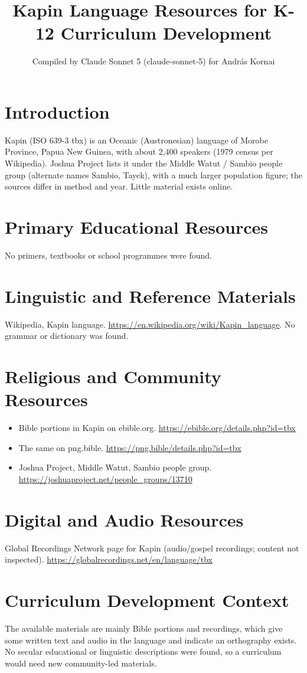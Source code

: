 \documentclass[12pt]{article}
\title{Kapin Language Resources for K-12 Curriculum Development}
\author{Compiled by Claude Sonnet 5 (claude-sonnet-5) for Andr\'as Kornai}
\date{}
\begin{document}
\maketitle
\section{Introduction}
Kapin (ISO 639-3 tbx) is an Oceanic (Austronesian) language of Morobe Province, Papua New Guinea, with about 2,400 speakers (1979 census per Wikipedia). Joshua Project lists it under the Middle Watut / Sambio people group (alternate names Sambio, Tayek), with a much larger population figure; the sources differ in method and year. Little material exists online.
\section{Primary Educational Resources}
No primers, textbooks or school programmes were found.
\section{Linguistic and Reference Materials}
Wikipedia, Kapin language. \url{https://en.wikipedia.org/wiki/Kapin_language}. No grammar or dictionary was found.
\section{Religious and Community Resources}
\begin{itemize}
\item Bible portions in Kapin on ebible.org. \url{https://ebible.org/details.php?id=tbx}
\item The same on png.bible. \url{https://png.bible/details.php?id=tbx}
\item Joshua Project, Middle Watut, Sambio people group. \url{https://joshuaproject.net/people_groups/13710}
\end{itemize}
\section{Digital and Audio Resources}
Global Recordings Network page for Kapin (audio/gospel recordings; content not inspected). \url{https://globalrecordings.net/en/language/tbx}
\section{Curriculum Development Context}
The available materials are mainly Bible portions and recordings, which give some written text and audio in the language and indicate an orthography exists. No secular educational or linguistic descriptions were found, so a curriculum would need new community-led materials.
\end{document}
